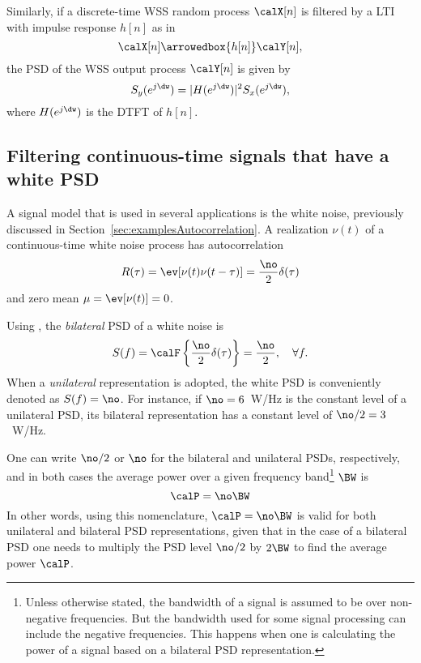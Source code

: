 Similarly, if a discrete-time WSS random process $\calX[n]$ is filtered by a LTI with impulse response $h[n]$ as in
\[
\calX[n] \arrowedbox{h[n]}  \calY[n],
\]
the PSD of the WSS output process $\calY[n]$ is given by
\begin{equation}
S_y(e^{j \dw}) = |H(e^{j \dw})|^2 S_x(e^{j \dw}),
\label{eq:discrete_filtered_wss}
\end{equation}
where $H(e^{j \dw})$ is the DTFT of $h[n]$.

\subsection{Filtering continuous-time signals that have a white PSD}
\label{sec:ctWhitePSD}

A signal model that is used in several applications is the white noise, previously discussed in Section~\ref{sec:examplesAutocorrelation}.
A realization $\nu(t)$ of a continuous-time white noise process has autocorrelation
\begin{equation}
R(\tau)=\ev[\nu(t) \nu(t-\tau)]=\frac \no 2 \delta(\tau)
\label{eq:awgnAutocorrelation}
\end{equation}
and zero mean $\mu = \ev[\nu(t)]=0$.

Using , the \emph{bilateral} PSD of a white noise is 
\begin{equation}
S(f) = \calF \left\{ \frac \no 2 \delta(\tau) \right\} = \frac \no 2, \textrm{~~~} \forall f.
\label{eq:psdWhiteNoise}
\end{equation}
When a \emph{unilateral} representation is adopted, the white PSD is conveniently denoted as $S(f) = \no$. For instance, if $\no=6$~W/Hz is the constant level of a unilateral PSD, its bilateral representation has a constant level of $\no/2 = 3$~W/Hz.

One can write $\no/2$ or $\no$ for the bilateral and unilateral PSDs, respectively, and in both cases the average power over a given frequency band\footnote{Unless otherwise stated, the bandwidth of a signal is assumed to be over non-negative frequencies. But the bandwidth used for some signal processing can include the negative frequencies. This happens when one is calculating
the power of a signal based on a bilateral PSD representation.} $\BW$ is 
\begin{equation}
\calP = \no \BW
\end{equation}
In other words, using this nomenclature, $\calP = \no \BW$ is valid for both unilateral and bilateral PSD representations, given that in the case of a bilateral PSD one needs to multiply the PSD level $\no/2$ by $2 \BW$ to find the average power $\calP$.

